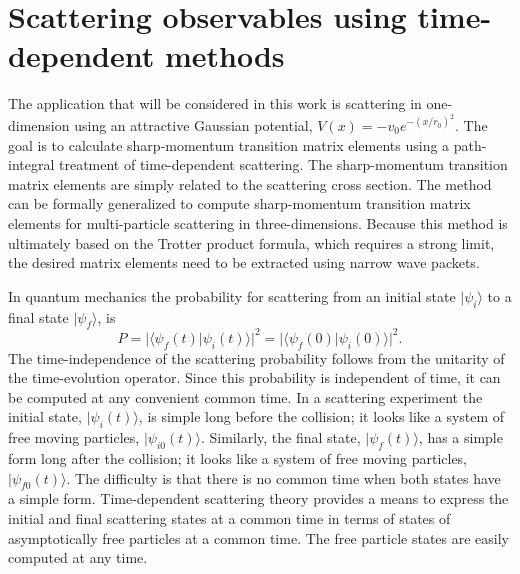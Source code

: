 \documentclass[aps,prc,reprint,noshowpacs,groupedaddress,onecolumn]{revtex4}
\def\beq{\begin{equation}}
\def\eeq{\end{equation}}
\begin{document}
\section{Scattering observables using time-dependent methods}

The application that will be considered in this work is scattering in
one-dimension using an attractive Gaussian potential, $V(x) = -v_0e^{-(x/r_0)^2}$.
The goal is to calculate sharp-momentum transition matrix elements
using a path-integral treatment of time-dependent scattering.  The
sharp-momentum transition matrix elements are simply related to the
scattering cross section.  The method can be formally generalized to
compute sharp-momentum transition matrix elements for multi-particle
scattering in three-dimensions.  Because this method is ultimately
based on the Trotter product formula, which requires a strong limit,
the desired matrix elements need to be extracted using narrow wave
packets.

In quantum mechanics the probability for scattering from an initial
state $\vert \psi_i \rangle$ to a final state $\vert \psi_f \rangle$,
is
\beq
P = \vert \langle \psi_f (t) \vert \psi_i (t) \rangle \vert^2 =
\vert \langle \psi_f (0) \vert \psi_i (0) \rangle \vert^2 .
\label{s.1}
\eeq
The time-independence of the scattering probability follows from the
unitarity of the time-evolution operator.  Since this probability is
independent of time, it can be computed at any convenient common time.
In a scattering experiment the initial state, $\vert \psi_i (t)
\rangle$, is simple long before the collision; it looks like a system
of free moving particles, $\vert \psi_{i0} (t) \rangle$.  Similarly,
the final state, $\vert \psi_f (t) \rangle$, has a simple form long
after the collision; it looks like a system of free moving particles,
$\vert \psi_{f0} (t) \rangle$.  The difficulty is that there is no
common time when both states have a simple form.  Time-dependent
scattering theory provides a means to express the initial and final
scattering states at a common time in terms of states of
asymptotically free particles at a common time.  The free particle
states are easily computed at any time.
\end{document}
